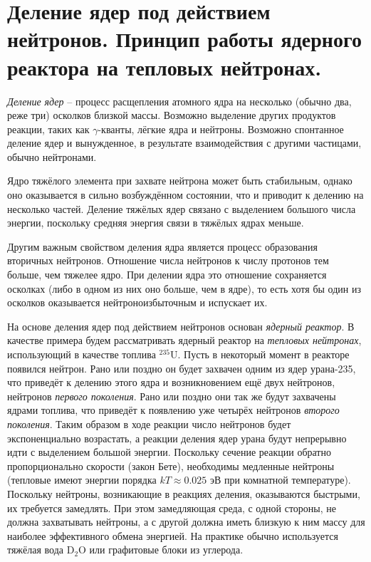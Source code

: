 \section{Деление ядер под действием нейтронов. Принцип работы ядерного реактора на тепловых нейтронах.}

\textit{Деление ядер} -- процесс расщепления атомного ядра на несколько (обычно два, реже три) осколков близкой массы. Возможно выделение других продуктов реакции, таких как $\gamma$-кванты, лёгкие ядра и нейтроны. Возможно спонтанное деление ядер и вынужденное, в результате взаимодействия с другими частицами, обычно нейтронами.

Ядро тяжёлого элемента при захвате нейтрона может быть стабильным, однако оно оказывается в сильно возбуждённом состоянии, что и приводит к делению на несколько частей. Деление тяжёлых ядер связано с выделением большого числа энергии, поскольку средняя энергия связи в тяжёлых ядрах меньше.

Другим важным свойством деления ядра является процесс образования вторичных нейтронов. Отношение числа нейтронов к числу протонов тем больше, чем тяжелее ядро. При делении ядра это отношение сохраняется осколках (либо в одном из них оно больше, чем в ядре), то есть хотя бы один из осколков оказывается нейтроноизбыточным и испускает их.

На основе деления ядер под действием нейтронов основан \textit{ядерный реактор}. В качестве примера будем рассматривать ядерный реактор на \textit{тепловых нейтронах}, использующий в качестве топлива $^{235}$U. Пусть в некоторый момент в реакторе появился нейтрон. Рано или поздно он будет захвачен одним из ядер урана-235, что приведёт к делению этого ядра и возникновением ещё двух нейтронов, нейтронов \textit{первого поколения}. Рано или поздно они так же будут захвачены ядрами топлива, что приведёт к появлению уже четырёх нейтронов \textit{второго поколения}. Таким образом в ходе реакции число нейтронов будет экспоненциально возрастать, а реакции деления ядер урана будут непрерывно идти с выделением большой энергии. Поскольку сечение реакции обратно пропорционально скорости (закон Бете), необходимы медленные нейтроны (тепловые имеют энергии порядка $k T \approx 0.025$ эВ при комнатной температуре). Поскольку нейтроны, возникающие в реакциях деления, оказываются быстрыми, их требуется замедлять. При этом замедляющая среда, с одной стороны, не должна захватывать нейтроны, а с другой должна иметь близкую к ним массу для наиболее эффективного обмена энергией. На практике обычно используется тяжёлая вода D$_2$O или графитовые блоки из углерода.

